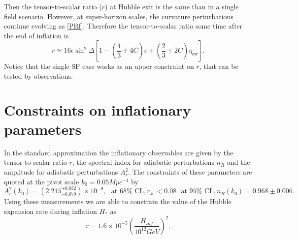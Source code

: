 \documentclass[amssymb,twocolumn,prd,nofootinbib,showpacs]{revtex4-1}
\begin{document}
Then the tensor-to-scalar ratio ($r$) at Hubble exit is the same than in a single field scenario. 
However, at super-horizon scales, the curvature perturbations continue evolving as \eqref{PRf}. 
Therefore the tensor-to-scalar ratio some time after the end of inflation is
\begin{equation}\label{Tensortoscalar}
r\simeq 16\epsilon \sin^2\Delta\left[1-\left(\frac{4}{3}+4C\right)\epsilon +\left(\frac{2}{3}+2C\right)\eta_{\sigma\sigma}\right].
\end{equation}
Notice that the single SF case works as an upper constraint on $r$, that can be tested by observations.

\section{Constraints on inflationary parameters}\label{experimentos}

In the standard approximation the inflationary observables are given by the tensor to scalar ratio $r$, 
the spectral index for adiabatic perturbations $n_R$ and the amplitude for adiabatic perturbations $A_r^2$.  
The constraints of these parameters are quoted at the pivot scale $k_0=0.05 Mpc^{-1}$ 
by \cite{const1,const2,planck,const3,const4,const5}
\begin{subequations}
\begin{equation}\label{amplitude}
A_r^2(k_0)=(2.215^{+0.032}_{-0.079})\times 10^{-9}, \ \ \ \text{at $68\%$ CL},
\end{equation}
\begin{equation}
r_{k_0}<0.08 \ \ \ \text{at $95\%$ CL},
\end{equation}
\begin{equation}\label{n_R}
n_R(k_0)=0.968 \pm 0.006.
\end{equation}
\end{subequations}
Using these measurements we are able to constrain the value of the Hubble expansion rate during 
inflation $H_*$ as \cite{H1,H2}
\begin{equation}\label{Hinf}
r = 1.6\times 10^{-5}\left(\frac{H_{inf}}{10^{12}GeV}\right)^2.
\end{equation}
\end{document}

